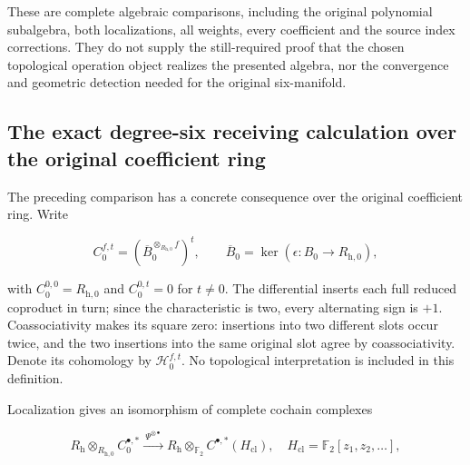 These are complete algebraic comparisons, including the original polynomial subalgebra, both localizations, all weights, every coefficient and the source index corrections. They do not supply the still-required proof that the chosen topological operation object realizes the presented algebra, nor the convergence and geometric detection needed for the original six-manifold.

\label{courseIII:coefficient-rings-and-the-original-degree-six-class:coefficient-all-length-receiving}

\subsection{The exact degree-six receiving calculation over the original coefficient ring}
\label{courseIII:coefficient-rings-and-the-original-degree-six-class:section-5}

\label{courseIII:coefficient-rings:5}

The preceding comparison has a concrete consequence over the original coefficient ring. Write

\begin{equation}
C_0^{f,t}=(\overline B_0^{\otimes_{R_{\mathrm h,0}}f})^t,
 \qquad
 \overline B_0=\ker(\epsilon:B_0\longrightarrow R_{\mathrm h,0}),
 \label{courseIII:coefficient-rings-and-the-original-degree-six-class:eq:5.1}
\end{equation}

with \(C_0^{0,0}=R_{\mathrm h,0}\) and \(C_0^{0,t}=0\) for \(t\ne0\). The differential inserts each full reduced coproduct in turn; since the characteristic is two, every alternating sign is \(+1\). Coassociativity makes its square zero: insertions into two different slots occur twice, and the two insertions into the same original slot agree by coassociativity. Denote its cohomology by \(\mathcal H_0^{f,t}\). No topological interpretation is included in this definition.

Localization gives an isomorphism of complete cochain complexes

\begin{equation}
R_{\mathrm h}\otimes_{R_{\mathrm h,0}} C_0^{\bullet,*}
  \xrightarrow{\ \Psi^{\otimes\bullet}\ }
 R_{\mathrm h}\otimes_{\mathbb F_2}
                      C^{\bullet,*}(H_{\mathrm{cl}}),
 \quad
 H_{\mathrm{cl}}=\mathbb F_2[z_1,z_2,\ldots],
 \label{courseIII:coefficient-rings-and-the-original-degree-six-class:eq:5.2}
\end{equation}

